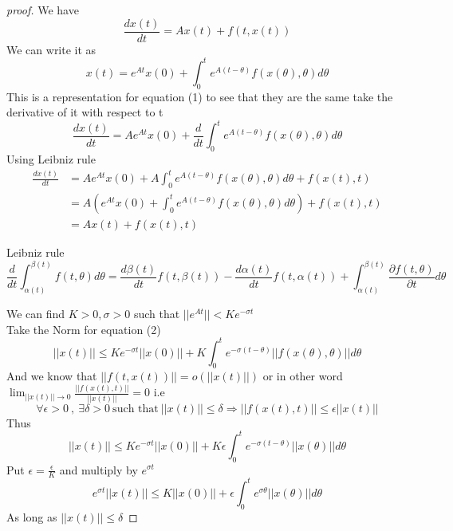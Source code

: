 \documentclass[]{article}
\begin{document}
\begin{proof}[proof]
    We have
    \begin{equation}
        \frac{dx(t)}{dt} = Ax(t) + f(t,x(t))
    \end{equation}
    We can write it as
    \begin{equation}
        x(t) = e^{At}x(0) + \int_{0}^{t} e^{A(t-\theta)} f(x(\theta),\theta) d \theta
    \end{equation}
    This is a representation for equation (1) to see that they are the same take the derivative of it with respect to t
    \[
        \frac{dx(t)}{dt} = A e^{At}x(0) + \frac{d}{dt} \int_{0}^{t} e^{A(t-\theta)} f(x(\theta),\theta) d \theta
    \]
    Using Leibniz rule
    \begin{align*}
        \frac{dx(t)}{dt} & = A e^{At}x(0) + A\int_{0}^{t} e^{A(t-\theta)} f(x(\theta),\theta) d \theta + f(x(t),t)
        \\
                         & =A\left(e^{At}x(0) + \int_{0}^{t} e^{A(t-\theta)} f(x(\theta),\theta) d \theta \right) + f(x(t),t)
        \\
                         & = Ax(t) + f(x(t),t)
    \end{align*}
    \begin{enrichment*}{Leibniz rule}
        \[
            \frac{d}{dt}\int_{\alpha(t)}^{\beta(t)} f(t,\theta)d\theta = \frac{d\beta(t)}{dt}f(t,\beta(t))-\frac{d\alpha(t)}{dt}f(t,\alpha(t)) + \int_{\alpha(t)}^{\beta(t)} \frac{\partial f(t,\theta)}{\partial t} d\theta
        \]
    \end{enrichment*}
    We can find $K>0,\sigma>0$ such that $||e^{At}||<Ke^{-\sigma t}$
    \\
    Take the Norm for equation (2)
    \[
        ||x(t)|| \leq Ke^{-\sigma t}||x(0)|| + K\int_{0}^{t} e^{-\sigma(t-\theta)} ||f(x(\theta),\theta)|| d \theta
    \]
    And we know that $||f(t,x(t))|| = o(||x(t)||)$ or in other word
    $\displaystyle \lim_{||x(t)|| \to 0}\frac{||f(x(t),t)||}{||x(t)||} = 0$ i.e
    \[
        \forall \epsilon >0 \  , \ \exists \delta >0 \ \text{such that} \ || x(t)|| \leq \delta \Longrightarrow
        ||f(x(t),t)|| \leq \epsilon ||x(t)||
    \]
    Thus
    \[
        ||x(t)|| \leq Ke^{-\sigma t}||x(0)|| + K \epsilon \int_{0}^{t} e^{-\sigma(t-\theta)} ||x(\theta)|| d \theta
    \]
    Put $\displaystyle \epsilon = \frac{\epsilon}{K}$ and multiply by  $e^{\sigma t}$
    \[
        e^{\sigma t}||x(t)|| \leq K||x(0)|| + \epsilon \int_{0}^{t} e^{\sigma \theta} ||x(\theta)|| d \theta
    \]
    As long as $||x(t)|| \leq \delta$


\end{proof}
\end{document}
